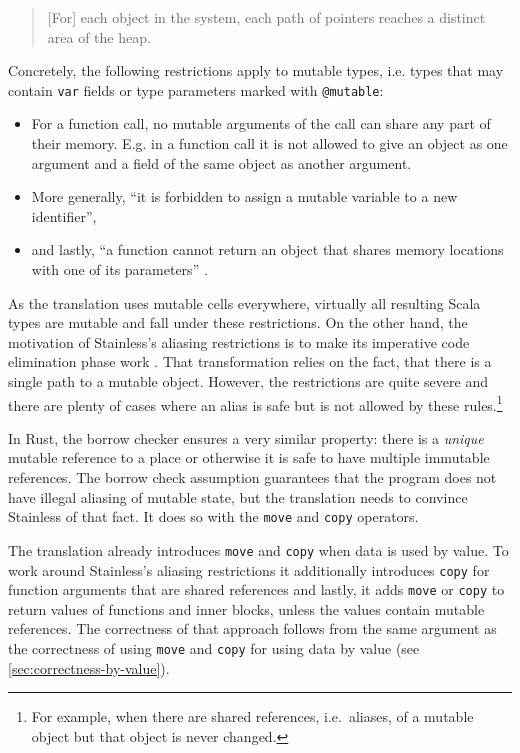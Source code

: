 \begin{quote}
{[}For{]} each object in the system, each path of pointers reaches a
distinct area of the heap. \cite[p.~59]{regb}
\end{quote}

Concretely, the following restrictions apply to mutable types, i.e. types that
may contain \lstinline!var! fields or type parameters marked with
\lstinline!@mutable!:

\begin{itemize}
\tightlist
\item
  For a function call, no mutable arguments of the call can share any
  part of their memory. E.g. in a function call it is not allowed to
  give an object as one argument and a field of the same object as
  another argument.
\item
  More generally, ``it is forbidden to assign a mutable variable to a
  new identifier'',
\item
  and lastly, ``a function cannot return an object that shares memory
  locations with one of its parameters'' \cite[p.~59]{regb}.
\end{itemize}

As the translation uses mutable cells everywhere, virtually all resulting Scala
types are mutable and fall under these restrictions. On the other hand, the
motivation of Stainless's aliasing restrictions is to make its imperative code
elimination phase work \cite{regb}. That transformation relies on the fact, that
there is a single path to a mutable object. However, the restrictions are quite
severe and there are plenty of cases where an alias is safe but is not allowed
by these rules.\footnote{For example, when there are shared references,
i.e.~aliases, of a mutable object but that object is never changed.}

In Rust, the borrow checker ensures a very similar property: there is a
\emph{unique} mutable reference to a place or otherwise it is safe to have
multiple immutable references. The borrow check assumption guarantees that the
program does not have illegal aliasing of mutable state, but the translation
needs to convince Stainless of that fact. It does so with the \lstinline!move!
and \lstinline!copy! operators.

The translation already introduces \lstinline!move! and \lstinline!copy! when
data is used by value. To work around Stainless's aliasing restrictions it
additionally introduces \lstinline!copy! for function arguments that are shared
references and lastly, it adds \lstinline!move! or \lstinline!copy! to return
values of functions and inner blocks, unless the values contain mutable
references. The correctness of that approach follows from the same argument as
the correctness of using \lstinline!move! and \lstinline!copy! for using data by
value (see \autoref{sec:correctness-by-value}).

